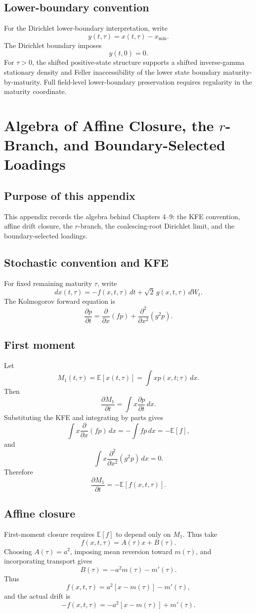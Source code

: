 \documentclass[11pt,oneside]{book}
\begin{document}
\section{Lower-boundary convention}
For the Dirichlet lower-boundary interpretation, write
\[
y(t,\tau)=x(t,\tau)-x_{\min}.
\]
The Dirichlet boundary imposes
\[
y(t,0)=0.
\]
For \(\tau>0\), the shifted positive-state structure supports a shifted inverse-gamma stationary density and Feller inaccessibility of the lower state boundary maturity-by-maturity. Full field-level lower-boundary preservation requires regularity in the maturity coordinate.

\chapter{Algebra of Affine Closure, the \texorpdfstring{\(r\)}{r}-Branch, and Boundary-Selected Loadings}\label{appendix-b}

\section{Purpose of this appendix}
This appendix records the algebra behind Chapters 4--9: the KFE convention, affine drift closure, the \(r\)-branch, the coalescing-root Dirichlet limit, and the boundary-selected loadings.

\section{Stochastic convention and KFE}
For fixed remaining maturity \(\tau\), write
\[
dx(t,\tau)=-f(x,t,\tau)\,dt+\sqrt{2}\,g(x,t,\tau)\,dW_t.
\]
The Kolmogorov forward equation is
\[
\frac{\partial p}{\partial t}
=
\frac{\partial}{\partial x}(fp)
+
\frac{\partial^2}{\partial x^2}(g^2p).
\]

\section{First moment}
Let
\[
M_1(t,\tau)=\mathbb{E}[x(t,\tau)]=\int x p(x,t;\tau)\,dx.
\]
Then
\[
\frac{\partial M_1}{\partial t}
=
\int x\frac{\partial p}{\partial t}\,dx.
\]
Substituting the KFE and integrating by parts gives
\[
\int x\frac{\partial}{\partial x}(fp)\,dx=-\int fp\,dx=-\mathbb{E}[f],
\]
and
\[
\int x\frac{\partial^2}{\partial x^2}(g^2p)\,dx=0.
\]
Therefore
\[
\frac{\partial M_1}{\partial t}=-\mathbb{E}[f(x,t,\tau)].
\]

\section{Affine closure}
First-moment closure requires \(\mathbb{E}[f]\) to depend only on \(M_1\). Thus take
\[
f(x,t,\tau)=A(\tau)x+B(\tau).
\]
Choosing \(A(\tau)=a^2\), imposing mean reversion toward \(m(\tau)\), and incorporating transport gives
\[
B(\tau)=-a^2m(\tau)-m'(\tau).
\]
Thus
\[
f(x,t,\tau)=a^2[x-m(\tau)]-m'(\tau),
\]
and the actual drift is
\[
-f(x,t,\tau)=-a^2[x-m(\tau)]+m'(\tau).
\]
\end{document}
